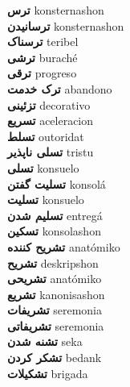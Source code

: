 \textbf{ ترس  } konsternashon \\
\textbf{ ترسانیدن  } konsternashon \\
\textbf{ ترسناک  } teribel \\
\textbf{ ترشی  } buraché \\
\textbf{ ترقی  } progreso \\
\textbf{ ترک خدمت  } abandono \\
\textbf{ تزئینی  } decorativo \\
\textbf{ تسریع  } aceleracion \\
\textbf{ تسلط  } outoridat \\
\textbf{ تسلی ناپذیر  } tristu \\
\textbf{ تسلی  } konsuelo \\
\textbf{ تسلیت گفتن  } konsolá \\
\textbf{ تسلیت  } konsuelo \\
\textbf{ تسلیم شدن  } entregá \\
\textbf{ تسکین  } konsolashon \\
\textbf{ تشریح کننده  } anatómiko \\
\textbf{ تشریح  } deskripshon \\
\textbf{ تشریحی  } anatómiko \\
\textbf{ تشریع  } kanonisashon \\
\textbf{ تشریفات  } seremonia \\
\textbf{ تشریفاتی  } seremonia \\
\textbf{ تشنه شدن  } seka \\
\textbf{ تشکر کردن  } bedank \\
\textbf{ تشکیلات  } brigada \\

